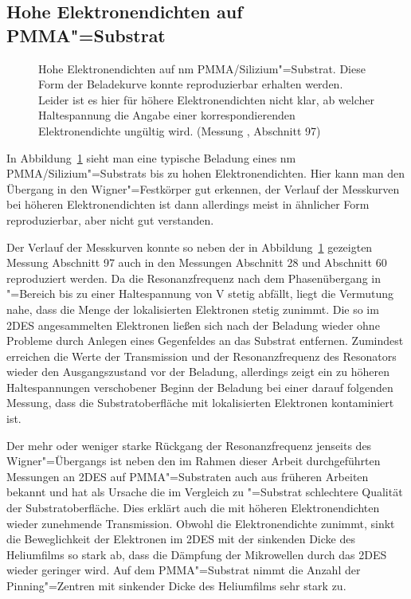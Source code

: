 \subsection{Hohe Elektronendichten auf PMMA"=Substrat}
\begin{figure}[h!tb]
    \hfill%
    \begin{minipage}[b]{\textwidth-\midwidth-\tabcolsep}
        \caption[Hohe Elektronendichten auf PMMA]{Hohe Elektronendichten auf \unit[200]{nm} PMMA/Silizium"=Substrat. Diese Form der Beladekurve konnte reproduzierbar erhalten werden. Leider ist es hier für höhere Elektronendichten nicht klar, ab welcher Haltespannung die Angabe einer korrespondierenden Elektronendichte ungültig wird. (Messung , Abschnitt 97)}
        \label{fig:high_n_pmma}
    \end{minipage}
\end{figure}
In Abbildung~\ref{fig:high_n_pmma} sieht man eine typische Beladung eines \unit[200]{nm} PMMA/Silizium"=Substrats bis zu hohen Elektronendichten. Hier kann man den Übergang in den Wigner"=Festkörper gut erkennen, der Verlauf der Messkurven bei höheren Elektronendichten ist dann allerdings meist in ähnlicher Form reproduzierbar, aber nicht gut verstanden.

Der Verlauf der Messkurven konnte so neben der in Abbildung~\ref{fig:high_n_pmma} gezeigten Messung  Abschnitt 97 auch in den Messungen  Abschnitt 28 und  Abschnitt 60 reproduziert werden. Da die Resonanzfrequenz nach dem Phasenübergang in "=Bereich bis zu einer Haltespannung von \unit[10]{V} stetig abfällt, liegt die Vermutung nahe, dass die Menge der lokalisierten Elektronen stetig zunimmt. Die so im 2DES angesammelten Elektronen ließen sich nach der Beladung wieder ohne Probleme durch Anlegen eines Gegenfeldes an das Substrat entfernen.  Zumindest erreichen die Werte der  Transmission und der Resonanzfrequenz des Resonators wieder den Ausgangszustand vor der Beladung, allerdings zeigt ein zu höheren Haltespannungen verschobener Beginn der Beladung bei einer darauf folgenden Messung, dass die Substratoberfläche mit lokalisierten Elektronen kontaminiert ist.

Der mehr oder weniger starke Rückgang der Resonanzfrequenz jenseits des Wigner"=Übergangs ist neben den im Rahmen dieser Arbeit durchgeführten Messungen an 2DES auf PMMA"=Substraten auch aus früheren Arbeiten bekannt und hat als Ursache die im Vergleich zu \SiO"=Substrat schlechtere Qualität der Substratoberfläche. Dies erklärt auch die mit höheren Elektronendichten wieder zunehmende Transmission. Obwohl die Elektronendichte zunimmt, sinkt die Beweglichkeit der Elektronen im 2DES mit der sinkenden Dicke des Heliumfilms so stark ab, dass die Dämpfung der Mikrowellen durch das 2DES wieder geringer wird. Auf dem PMMA"=Substrat nimmt die Anzahl der Pinning"=Zentren mit sinkender Dicke des Heliumfilms sehr stark zu.

